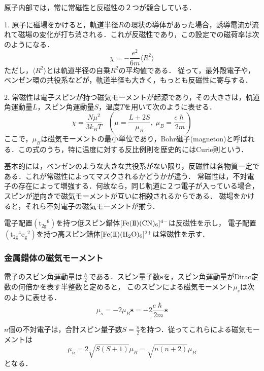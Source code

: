 \documentclass[uplatex, dvipdfmx]{jsreport}
\begin{document}
\begin{model}[磁性]原子内部では，常に常磁性と反磁性の２つが競合している．

    1. 原子に磁場をかけると，軌道半径$R$の環状の導体があった場合，誘導電流が流れて磁場の変化が打ち消される．これが反磁性であり，この設定での磁荷率は次のようになる．
    \[ \chi = -\frac{e^2}{6m}\langle R^2\rangle \]
    ただし，$\langle R^2\rangle$とは軌道半径の自乗$R^2$の平均値である．
    従って，最外殻電子や，ベンゼン環の共役系などが，軌道半径も大きく，もっとも反磁性に寄与する．

    2. 常磁性は電子スピンが持つ磁気モーメントが起源であり，その大きさは，軌道角運動量$L$，スピン角運動量$S$，温度$T$を用いて次のように表せる．
    \[ \chi = \frac{N\mu^2}{3k_BT}\;\;\; (\mu=\frac{L+2S}{\mu_B},\;\mu_B=\frac{e\hslash}{2m}) \]
    ここで，$\mu_B$は磁気モーメントの最小単位であり，Bohr磁子(magneton)と呼ばれる．この式のうち，特に温度に対する反比例則を歴史的にはCurie則という．

    基本的には，ベンゼンのような大きな共役系がない限り，反磁性は各物質一定である．これが常磁性によってマスクされるかどうかが違う．
    常磁性は，不対電子の存在によって増強する．何故なら，同じ軌道に２つ電子が入っている場合，スピンが逆向きで磁気モーメントが互いに相殺されるからである．
    磁場をかけると，それら不対電子の磁気モーメントが揃う．
\end{model}
\begin{example}[高スピン錯体は常磁性が強い]
    電子配置$(\mathrm{t_{2g}}^6)$を持つ低スピン錯体$[\mathrm{Fe(I\hspace{-.1em}I)(CN)_6}]^{4-}$は反磁性を示し，
    電子配置$(\mathrm{t_{2g}}^4\mathrm{e_g}^2)$を持つ高スピン錯体$[\mathrm{Fe(I\hspace{-.1em}I)(H_2O)_6}]^{2+}$は常磁性を示す．
\end{example}

\subsubsection{金属錯体の磁気モーメント}

\begin{theory}[錯体の磁気モーメントの計算]
    電子のスピン角運動量は$\frac{\hslash}{2}$である．スピン量子数$\mathbf{s}$を，スピン角運動量がDirac定数の何倍かを表す半整数と定めると，
    このスピンによる磁気モーメント$\mu_s$は次のように表せる．
    \[ \mu_s=-2\mu_B\mathbf{s}=-2\frac{e\hslash}{2m}\mathbf{s} \]

    $n$個の不対電子は，合計スピン量子数$S=\frac{n}{2}$を持つ．従ってこれらによる磁気モーメントは
    \[\mu_n = 2\sqrt{S(S+1)}\mu_B = \sqrt{n(n+2)}\mu_B \]
    となる．
\end{theory}
\end{document}
